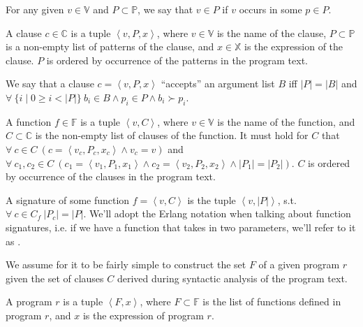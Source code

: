 \begin{definition} For any given $v\in\mathbb{V}$ and $P\subset\mathbb{P}$,
we say that $v\in P$ if $v$ occurs in some $p\in P$.\end{definition}

\begin{definition}\label{definition:clause-tuple} A clause $c\in\mathbb{C}$ is
a tuple $\left\langle v,P,x \right\rangle$, where $v\in\mathbb{V}$ is the name
of the clause, $P\subset\mathbb{P}$ is a non-empty list of patterns of the
clause, and $x\in\mathbb{X}$ is the expression of the clause. $P$ is ordered by
occurrence of the patterns in the program text.\end{definition}

\begin{definition} We say that a clause $c= \left\langle v,P,x \right\rangle$
``accepts'' an argument list $B$ iff $|P|=|B|$ and $\forall\ \{i\mid 0\geq i <
|P|\}\ b_i\in B \wedge p_i\in P \wedge b_i\succ p_i$.\end{definition}

\begin{definition}\label{definition:function-tuple} A function $f\in\mathbb{F}$
is a tuple $\left\langle v,C \right\rangle$, where $v \in \mathbb{V}$ is the
name of the function, and $C\subset\mathbb{C}$ is the non-empty list of clauses
of the function. It must hold for $C$ that $\forall\ c\in C\
\left(c=\left\langle v_c, P_c, x_c \right\rangle \wedge v_c=v\right)$ and
$\forall\ c_1,c_2\in C\ \left(c_1=\left\langle v_1, P_1, x_1 \right\rangle
\wedge c_2=\left\langle v_2, P_2, x_2 \right\rangle \wedge |P_1|=|P_2|\right)$.
$C$ is ordered by occurrence of the clauses in the program
text.\end{definition}

\begin{definition} A signature of some function $f=\left\langle v, C
\right\rangle$ is the tuple $\left\langle v,|P| \right\rangle$, s.t.
$\forall\ c\in C_f\ |P_c|=|P|$. We'll adopt the Erlang notation when talking
about function signatures, i.e. if we have a function \mono{less} that takes in
two parameters, we'll refer to it as \mono{less/2}.\end{definition}

We assume for it to be fairly simple to construct the set $F$ of a given
program $r$ given the set of clauses $C$ derived during syntactic analysis of
the program text.

\begin{definition} A program $r$ is a tuple $\left\langle F,x \right\rangle$,
where $F\subset\mathbb{F}$ is the list of functions defined in program $r$, and
$x$ is the expression of program $r$.\end{definition}

